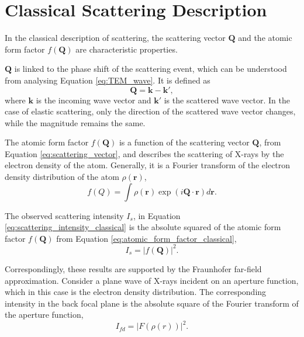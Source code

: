 
\section{Classical Scattering Description}\label{sec:classical_scattering}

In the classical description of scattering, the scattering vector $\bm{Q}$ and the atomic form factor $f(\bm{Q})$ are characteristic properties.

$\bm{Q}$ is linked to the phase shift of the scattering event, which can be understood from analysing Equation \eqref{eq:TEM_wave}. It is defined as
\begin{equation}\label{eq:scattering_vector}
    \bm{Q} = \bm{k} - \bm{k'},
\end{equation}
where $\bm{k}$ is the incoming wave vector and $\bm{k'}$ is the scattered wave vector.
In the case of elastic scattering, only the direction of the scattered wave vector changes, while the magnitude remains the same.

The atomic form factor $f(\bm{Q})$ is a function of the scattering vector $\bm{Q}$, from Equation \eqref{eq:scattering_vector},
and describes the scattering of X-rays by the electron density of the atom.
Generally, it is a Fourier transform of the electron density distribution of the atom $\rho(\bm{r})$,
\begin{equation}\label{eq:atomic_form_factor_classical}
    f(Q) = \int \rho(\bm{r}) \exp\left(i\bm{Q}\cdot\bm{r}\right) d\bm{r}.
\end{equation}

The observed scattering intensity $I_{s}$, in Equation \eqref{eq:scattering_intensity_classical} is the absolute squared of the atomic form factor $f(\bm{Q})$ from Equation \eqref{eq:atomic_form_factor_classical},
\begin{equation}\label{eq:scattering_intensity_classical}
    I_{s} = |f(\bm{Q})|^{2}.
\end{equation}

Correspondingly, these results are supported by the Fraunhofer far-field approximation. Consider a plane wave of X-rays incident on an aperture function, which in this case is the electron density distribution.
The corresponding intensity in the back focal plane is the absolute square of the Fourier transform of the aperture function,
\begin{equation}\label{eq:Fraunhofer_intensity}
    I_{fd} = |F\left(\rho(r) \right) |^{2}.
\end{equation}

